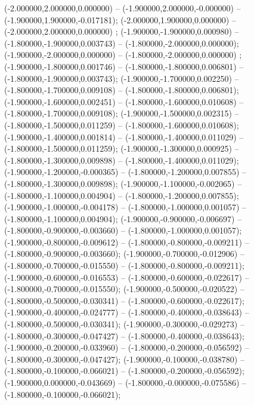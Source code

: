  (-2.000000,2.000000,0.000000) -- (-1.900000,2.000000,-0.000000) -- (-1.900000,1.900000,-0.017181);
 (-2.000000,1.900000,0.000000) -- (-2.000000,2.000000,0.000000) ;
 (-1.900000,-1.900000,0.000980) -- (-1.800000,-1.900000,0.003743) -- (-1.800000,-2.000000,0.000000);
 (-1.900000,-2.000000,0.000000) -- (-1.800000,-2.000000,0.000000) ;
 (-1.900000,-1.800000,0.001746) -- (-1.800000,-1.800000,0.006801) -- (-1.800000,-1.900000,0.003743);
 (-1.900000,-1.700000,0.002250) -- (-1.800000,-1.700000,0.009108) -- (-1.800000,-1.800000,0.006801);
 (-1.900000,-1.600000,0.002451) -- (-1.800000,-1.600000,0.010608) -- (-1.800000,-1.700000,0.009108);
 (-1.900000,-1.500000,0.002315) -- (-1.800000,-1.500000,0.011259) -- (-1.800000,-1.600000,0.010608);
 (-1.900000,-1.400000,0.001814) -- (-1.800000,-1.400000,0.011029) -- (-1.800000,-1.500000,0.011259);
 (-1.900000,-1.300000,0.000925) -- (-1.800000,-1.300000,0.009898) -- (-1.800000,-1.400000,0.011029);
 (-1.900000,-1.200000,-0.000365) -- (-1.800000,-1.200000,0.007855) -- (-1.800000,-1.300000,0.009898);
 (-1.900000,-1.100000,-0.002065) -- (-1.800000,-1.100000,0.004904) -- (-1.800000,-1.200000,0.007855);
 (-1.900000,-1.000000,-0.004178) -- (-1.800000,-1.000000,0.001057) -- (-1.800000,-1.100000,0.004904);
 (-1.900000,-0.900000,-0.006697) -- (-1.800000,-0.900000,-0.003660) -- (-1.800000,-1.000000,0.001057);
 (-1.900000,-0.800000,-0.009612) -- (-1.800000,-0.800000,-0.009211) -- (-1.800000,-0.900000,-0.003660);
 (-1.900000,-0.700000,-0.012906) -- (-1.800000,-0.700000,-0.015550) -- (-1.800000,-0.800000,-0.009211);
 (-1.900000,-0.600000,-0.016553) -- (-1.800000,-0.600000,-0.022617) -- (-1.800000,-0.700000,-0.015550);
 (-1.900000,-0.500000,-0.020522) -- (-1.800000,-0.500000,-0.030341) -- (-1.800000,-0.600000,-0.022617);
 (-1.900000,-0.400000,-0.024777) -- (-1.800000,-0.400000,-0.038643) -- (-1.800000,-0.500000,-0.030341);
 (-1.900000,-0.300000,-0.029273) -- (-1.800000,-0.300000,-0.047427) -- (-1.800000,-0.400000,-0.038643);
 (-1.900000,-0.200000,-0.033960) -- (-1.800000,-0.200000,-0.056592) -- (-1.800000,-0.300000,-0.047427);
 (-1.900000,-0.100000,-0.038780) -- (-1.800000,-0.100000,-0.066021) -- (-1.800000,-0.200000,-0.056592);
 (-1.900000,0.000000,-0.043669) -- (-1.800000,-0.000000,-0.075586) -- (-1.800000,-0.100000,-0.066021);
